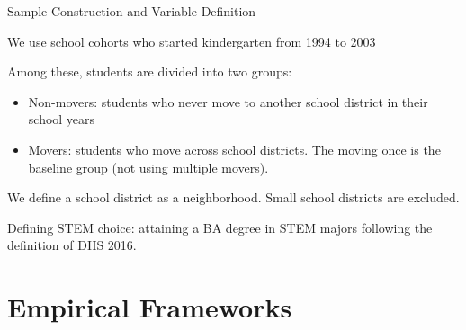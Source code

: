 \documentclass[aspectratio=169,xcolor=dvipsnames]{beamer}
\newenvironment{wideitemize}{\itemize\addtolength{\itemsep}{10pt}}{\enditemize}
\begin{document}
\begin{frame}{Sample Construction and Variable Definition}\label{}

\begin{wideitemize}
    \item We use school cohorts who started kindergarten from 1994 to 2003
    \item Among these, students are divided into two groups:
    \begin{itemize}
        \item Non-movers: students who never move to another school district in their school years
        \item Movers: students who move across school districts. The moving once is the baseline group (not using multiple movers).
    \end{itemize}
    \item We define a school district as a neighborhood. Small school districts are excluded.
    \item Defining STEM choice: attaining a BA degree in STEM majors following the definition of DHS 2016.
\end{wideitemize}
\end{frame}

    

\section{Empirical Frameworks}
\end{document}
